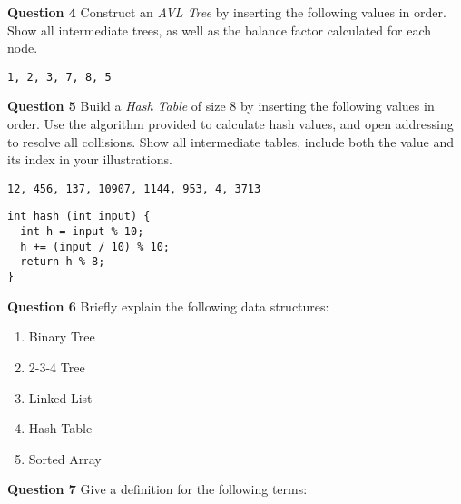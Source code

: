 \documentclass{letter}
\begin{document}
\clearpage

{\bf Question 4} \kern 1cm Construct an {\em AVL Tree} by inserting the
following values in order.  Show all intermediate trees, as well as the balance
factor calculated for each node.

\begin{verbatim}
1, 2, 3, 7, 8, 5
\end{verbatim}

\clearpage

{\bf Question 5} \kern 1cm Build a {\em Hash Table} of size 8 by inserting the
following values in order.  Use the algorithm provided to calculate hash
values, and open addressing to resolve all collisions.  Show all intermediate
tables, include both the value and its index in your illustrations.

\begin{verbatim}
12, 456, 137, 10907, 1144, 953, 4, 3713
\end{verbatim}

\begin{verbatim}
int hash (int input) {
  int h = input % 10;
  h += (input / 10) % 10;
  return h % 8;
}
\end{verbatim}

\clearpage

{\bf Question 6} \kern 1cm Briefly explain the following data structures:

\begin{enumerate}[label=(\alph*)]

\item Binary Tree

\vspace{3cm}

\item 2-3-4 Tree

\vspace{3cm}

\item Linked List

\vspace{3cm}

\item Hash Table

\vspace{3cm}

\item Sorted Array

\end{enumerate}

\clearpage

{\bf Question 7} \kern 1cm Give a definition for the following terms:
\end{document}

